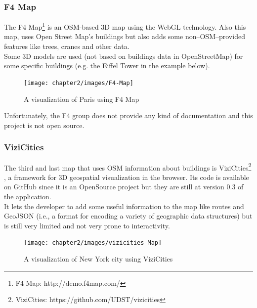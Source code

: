 \subsubsection{F4 Map}
The F4 Map\footnote{F4 Map: http://demo.f4map.com/} is an OSM-based 3D map using the WebGL technology. Also this map, uses Open Street Map's buildings but also adds some non--OSM--provided features like trees, cranes and other data.\\
 Some 3D models are used (not based on buildings data in OpenStreetMap) for some specific buildings (e.g. the Eiffel Tower in the example below).
\begin{figure}[H]
\centering
\texttt{[image: chapter2/images/F4-Map]}
\caption{A visualization of Paris using F4 Map}
\label{fig:F4-Map}
\end{figure}
Unfortunately, the F4 group does not provide any kind of documentation and this project is not open source.
\subsubsection{ViziCities}
The third and last map that uses OSM information about buildings is ViziCities\footnote{ViziCities: https://github.com/UDST/vizicities} , a framework for 3D geospatial visualization in the browser. Its code is available on GitHub since it is an OpenSource project but they are still at version 0.3 of the application.\\It lets the developer to add some useful information to the map like routes and GeoJSON (i.e., a format for encoding a variety of geographic data structures) but is still very limited and not very prone to interactivity.
\begin{figure}[H]
\centering
\texttt{[image: chapter2/images/vizicities-Map]}
\caption{A visualization of New York city using ViziCities}
\label{fig:vizicities-Map}
\end{figure}

